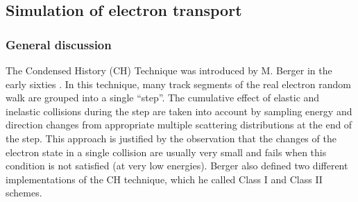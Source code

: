 
%
%
%
%
%
%
%
%
%


\subsection{Simulation of electron transport}

\label{chapter_electron_transport}

\subsubsection{General discussion}
\label{electron_general}
\setcounter{equation}{0}

The Condensed History (CH) Technique was introduced by M. Berger in 
the early sixties \cite{Be63}. 
In this technique, many track segments of the real electron random
walk are grouped into a single ``step''. The cumulative effect
of elastic and inelastic collisions during the step are taken into
account by sampling energy and direction changes from
appropriate multiple scattering distributions at the end of the step.
This approach is justified by the observation that the changes of
the electron state in a single collision are usually very small and 
fails when this condition is not satisfied (at very low energies).
Berger also defined two different implementations of the CH technique, 
which he called Class I and Class II schemes.

